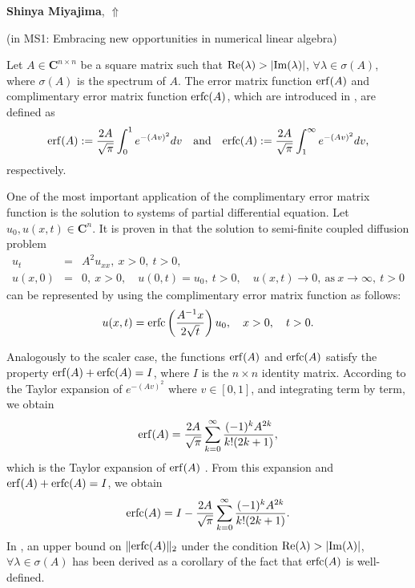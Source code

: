 \documentclass[ILAS2025-program.tex]{subfiles}
\begin{document}
     \hypertarget{down0347}{}\begin{ilasabstract}
    
    \textbf{Shinya Miyajima},  \hfill \hyperlink{up0347}{$\Uparrow$}
    
    (in {\color{mstitle}MS1: Embracing new opportunities in numerical linear algebra})
        
        \mtskip
    \begin{bibunit}
        Let $A \in \mathbf{C}^{n \times n}$ be a square matrix such that ${\rm Re}(\lambda) > |{\rm Im}(\lambda)|$, $\forall \lambda \in \sigma(A)$, where $\sigma(A)$ is the spectrum of $A$. 
The error matrix function ${\rm erf}(A)$ and complimentary error matrix function ${\rm erfc}(A)$, which are introduced in \cite{Cortes}, are defined as 
$$
{\rm erf}(A) := \frac{2A}{\sqrt{\pi}}\int_{0}^{1} e^{-(Av)^{2}} dv \quad \mbox{and} \quad {\rm erfc}(A) := \frac{2A}{\sqrt{\pi}}\int_{1}^{\infty} e^{-(Av)^{2}} dv,
$$
respectively. 

One of the most important application of the complimentary error matrix function is the solution to systems of partial differential equation. 
Let $u_0, u(x,t) \in \mathbf{C}^n$. 
It is proven in \cite{Cortes} that the solution to semi-finite coupled diffusion problem 
\begin{eqnarray*}
u_{t} &=& A^2u_{xx}, \ x>0, \ t>0, \\
u(x,0) &=& 0, \ x>0, \quad 
u(0,t) = u_{0}, \ t>0, \quad 
u(x,t) \to 0, \ \textrm{as} \ x\rightarrow\infty, \ t > 0
\end{eqnarray*}
can be represented by using the complimentary error matrix function as follows:
$$
u(x,t) = {\rm erfc}\left(\frac{A^{-1}x}{2\sqrt{t}}\right)u_{0}, \quad x>0, \quad t>0. 
$$

Analogously to the scaler case, the functions ${\rm erf}(A)$ and ${\rm erfc}(A)$ satisfy the property ${\rm erf}(A) + {\rm erfc}(A) = I$, where $I$ is the $n \times n$ identity matrix. 
According to the Taylor expansion of $e^{-(Av)^{2}}$ where $v \in [0,1]$, and integrating term by term, we obtain 
$$
{\rm erf}(A) = \frac{2A}{\sqrt{\pi}}\sum_{k=0}^{\infty}\frac{(-1)^k A^{2k}}{k! (2k+1)}, 
$$
which is the Taylor expansion of ${\rm erf}(A)$ \cite{Cortes}. 
From this expansion and ${\rm erf}(A) + {\rm erfc}(A) = I$, we obtain 
$$
{\rm erfc}(A) = I - \frac{2A}{\sqrt{\pi}}\sum_{k=0}^{\infty}\frac{(-1)^k A^{2k}}{k! (2k+1)}. 
$$
In \cite{Cortes}, an upper bound on $\|{\rm erfc}(A)\|_2$ under the condition ${\rm Re}(\lambda) > |{\rm Im}(\lambda)|$, $\forall \lambda \in \sigma(A)$ has been derived as a corollary of the fact that ${\rm erfc}(A)$ is well-defined. 


\end{bibunit}
\end{ilasabstract}
\end{document}
